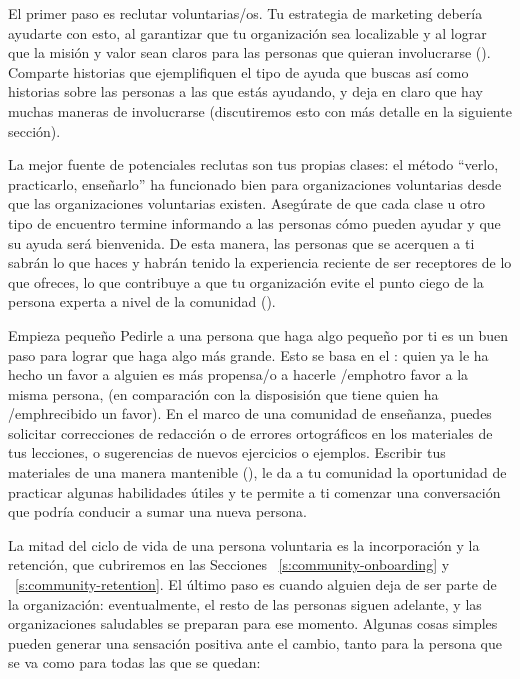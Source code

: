 El primer paso es reclutar voluntarias/os.
Tu estrategia de marketing debería ayudarte con esto, al garantizar que tu organización sea localizable
y al lograr que la misión y valor sean claros
para las personas que quieran involucrarse ().
Comparte historias que ejemplifiquen el tipo de ayuda que buscas 
así como historias sobre las personas a las que estás ayudando,
y deja en claro que hay muchas maneras de involucrarse
(discutiremos esto con más detalle en la siguiente sección).

La mejor fuente de potenciales reclutas son tus propias clases:
el método ``verlo, practicarlo, enseñarlo'' ha funcionado bien para organizaciones voluntarias
desde que las organizaciones voluntarias existen.
Asegúrate de que cada clase u otro tipo de encuentro
termine informando a las personas cómo pueden ayudar y que su ayuda será bienvenida.
De esta manera, las personas que se acerquen a ti sabrán lo que haces
y habrán tenido la experiencia reciente de ser receptores de lo que ofreces,
lo que contribuye a que tu organización evite el punto ciego de la persona experta a nivel de la comunidad ().

\begin{aside}{Empieza pequeño}
  Pedirle a una persona que haga algo pequeño por ti
  es un buen paso para lograr que haga algo más grande. Esto se basa en el :
  quien ya le ha hecho un favor a alguien es más propensa/o
  a hacerle /emph{otro} favor a la misma persona,
  (en comparación con la disposisión que tiene quien ha /emph{recibido} un favor).
  En el marco de una comunidad de enseñanza, 
  puedes solicitar correcciones de redacción o de errores ortográficos en los materiales de tus lecciones,
  o sugerencias de nuevos ejercicios o ejemplos.
  Escribir tus materiales de una manera mantenible (),
  le da a tu comunidad la oportunidad de practicar algunas habilidades útiles
  y te permite a ti comenzar una conversación
  que podría conducir a sumar una nueva persona.
\end{aside}


La mitad del ciclo de vida de una persona voluntaria es la incorporación y la retención,
que cubriremos en las Secciones ~\ref{s:community-onboarding} y ~\ref{s:community-retention}.
El último paso es cuando alguien deja de ser parte de la organización:
eventualmente, el resto de las personas siguen adelante,
y las organizaciones saludables se preparan para ese momento.
Algunas cosas simples pueden generar una sensación positiva ante el cambio, tanto para la persona que se va como para todas las que se quedan:



